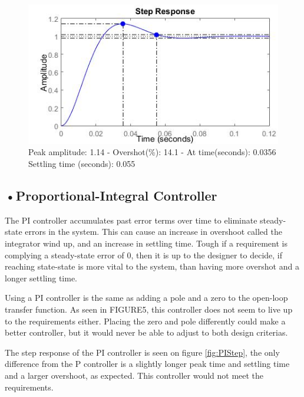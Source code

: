 \begin{figure}[h!]
\centering
\includegraphics[scale=0.7]{Billeder/PStep.jpg}
\caption{ Peak amplitude: 1.14 - Overshot(\%): 14.1 - At time(seconds): 0.0356
		 Settling time (seconds): 0.055 }
\label{fig:PStep}
\end{figure}

\subsection{•Proportional-Integral Controller}

The PI controller accumulates past error terms over time to eliminate steady-state errors in the system. This can cause an increase in overshoot called the integrator wind up, and an increase in settling time. Tough if a requirement is complying a steady-state error of 0, then it is up to the designer to decide, if reaching state-state is more vital to the system, than having more overshot and a longer settling time.\par

Using a PI controller is the same as adding a pole and a zero to the open-loop transfer function. As seen in FIGURE5, this controller does not seem to live up to the requirements either. Placing the zero and pole differently could make a better controller, but it would never be able to adjust to both design criterias.\par

The step response of the PI controller is seen on figure \ref{fig:PIStep}, the only difference from the P controller is a slightly longer peak time and settling time and a larger overshoot, as expected. This controller would not meet the requirements. 


